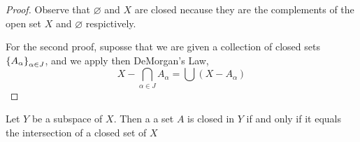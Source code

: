 \begin{proof}
	Observe that $ \varnothing $ and $X$ are closed necause they are the complements of the open set $X$ and $ \varnothing $ respictively.
	
	For the second proof, suposse that we are given a collection of closed sets $ \left\lbrace A_\alpha \right\rbrace_{\alpha \in J} $, and we apply then DeMorgan's Law,
	\[ X - \bigcap_{\alpha \in J} A_\alpha =\bigcup (X - A_\alpha) \]
\end{proof}

\begin{thm}
	Let $Y$ be a subspace of $X$. Then a a set $A$ is closed in $Y$ if and only if it equals the intersection of a closed set of $X$
\end{thm}







